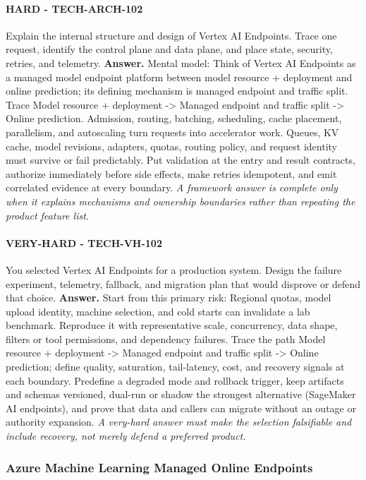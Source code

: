 \paragraph{HARD - TECH-ARCH-102} Explain the internal structure and design of Vertex AI Endpoints. Trace one request, identify the control plane and data plane, and place state, security, retries, and telemetry.
\textbf{Answer.} Mental model: Think of Vertex AI Endpoints as a managed model endpoint platform between model resource + deployment and online prediction; its defining mechanism is managed endpoint and traffic split. Trace Model resource + deployment -> Managed endpoint and traffic split -> Online prediction. Admission, routing, batching, scheduling, cache placement, parallelism, and autoscaling turn requests into accelerator work. Queues, KV cache, model revisions, adapters, quotas, routing policy, and request identity must survive or fail predictably. Put validation at the entry and result contracts, authorize immediately before side effects, make retries idempotent, and emit correlated evidence at every boundary.
\textit{A framework answer is complete only when it explains mechanisms and ownership boundaries rather than repeating the product feature list.}
\paragraph{VERY-HARD - TECH-VH-102} You selected Vertex AI Endpoints for a production system. Design the failure experiment, telemetry, fallback, and migration plan that would disprove or defend that choice.
\textbf{Answer.} Start from this primary risk: Regional quotas, model upload identity, machine selection, and cold starts can invalidate a lab benchmark. Reproduce it with representative scale, concurrency, data shape, filters or tool permissions, and dependency failures. Trace the path Model resource + deployment -> Managed endpoint and traffic split -> Online prediction; define quality, saturation, tail-latency, cost, and recovery signals at each boundary. Predefine a degraded mode and rollback trigger, keep artifacts and schemas versioned, dual-run or shadow the strongest alternative (SageMaker AI endpoints), and prove that data and callers can migrate without an outage or authority expansion.
\textit{A very-hard answer must make the selection falsifiable and include recovery, not merely defend a preferred product.}
\subsubsection*{Azure Machine Learning Managed Online Endpoints}

